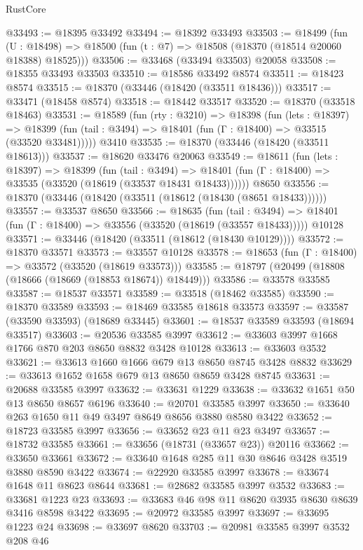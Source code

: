\begin{lexlean}{RustCore}
\begin{coremodule}
@33493 := @18395 @33492
@33494 := @18392 @33493
@33503 := @18499
    (fun (U : @18498) => @18500 (fun (t : @7) => @18508 (@18370 (@18514 @20060 @18388) @18525)))
@33506 := @33468 (@33494 @33503) @20058
@33508 := @18355 @33493 @33503
@33510 := @18586 @33492 @8574
@33511 := @18423 @8574
@33515 := @18370 (@33446 (@18420 (@33511 @18436)))
@33517 := @33471 (@18458 @8574)
@33518 := @18442 @33517
@33520 := @18370 (@33518 @18463)
@33531 := @18589
    (fun (rty : @3210) =>
    @18398
      (fun (lets : @18397) =>
      @18399 (fun (tail : @3494) => @18401 (fun (Γ : @18400) => @33515 (@33520 @33481)))))
    @3410
@33535 := @18370 (@33446 (@18420 (@33511 @18613)))
@33537 := @18620 @33476 @20063
@33549 := @18611
    (fun (lets : @18397) =>
    @18399
      (fun (tail : @3494) =>
      @18401 (fun (Γ : @18400) => @33535 (@33520 (@18619 (@33537 @18431 @18433))))))
    @8650
@33556 := @18370 (@33446 (@18420 (@33511 (@18612 (@18430 (@8651 @18433))))))
@33557 := @33537 @8650
@33566 := @18635
    (fun (tail : @3494) => @18401 (fun (Γ : @18400) => @33556 (@33520 (@18619 (@33557 @18433)))))
    @10128
@33571 := @33446 (@18420 (@33511 (@18612 (@18430 @10129))))
@33572 := @18370 @33571
@33573 := @33557 @10128
@33578 := @18653 (fun (Γ : @18400) => @33572 (@33520 (@18619 @33573)))
@33585 := @18797 (@20499 (@18808 (@18666 (@18669 (@18853 @18674)) @18449)))
@33586 := @33578 @33585
@33587 := @18537 @33571
@33589 := @33518 (@18462 @33585)
@33590 := @18370 @33589
@33593 := @18469 @33585 @18618 @33573
@33597 := @33587 (@33590 @33593) (@18689 @33445)
@33601 := @18537 @33589 @33593 (@18694 @33517)
@33603 := @20536 @33585 @3997
@33612 := @33603 @3997 @1668 @1766 @870 @203 @8650 @8832 @3428 @10128
@33613 := @33603 @3532
@33621 := @33613 @1660 @1666 @679 @13 @8650 @8745 @3428 @8832
@33629 := @33613 @1652 @1658 @679 @13 @8650 @8659 @3428 @8745
@33631 := @20688 @33585 @3997
@33632 := @33631 @1229
@33638 := @33632 @1651 @50 @13 @8650 @8657 @6196
@33640 := @20701 @33585 @3997
@33650 := @33640 @263 @1650 @11 @49 @3497 @8649 @8656 @3880 @8580 @3422
@33652 := @18723 @33585 @3997
@33656 := @33652 @23 @11 @23 @3497
@33657 := @18732 @33585
@33661 := @33656 (@18731 (@33657 @23)) @20116
@33662 := @33650 @33661
@33672 := @33640 @1648 @285 @11 @30 @8646 @3428 @3519 @3880 @8590 @3422
@33674 := @22920 @33585 @3997
@33678 := @33674 @1648 @11 @8623 @8644
@33681 := @28682 @33585 @3997 @3532
@33683 := @33681 @1223 @23
@33693 := @33683 @46 @98 @11 @8620 @3935 @8630 @8639 @3416 @8598 @3422
@33695 := @20972 @33585 @3997
@33697 := @33695 @1223 @24
@33698 := @33697 @8620
@33703 := @20981 @33585 @3997 @3532 @208 @46

\end{coremodule}
\end{lexlean}
